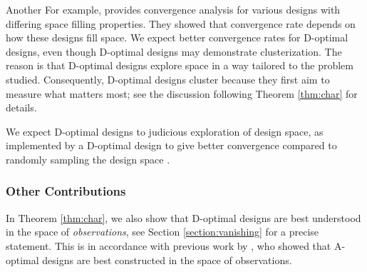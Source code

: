 Another For example, \cite{tekentrup2020} provides convergence analysis for
various designs with differing space filling properties. They showed
that convergence rate depends on how these designs fill space. We
expect better convergence rates for D-optimal designs, even though
D-optimal designs may demonstrate clusterization. The reason is that
D-optimal designs explore space in a way tailored to the problem
studied. Consequently, D-optimal designs cluster because they first
aim to measure what matters most; see the discussion following
Theorem \ref{thm:char} for details.









We expect D-optimal designs to judicious exploration of
design space, as implemented by a D-optimal design to give better
convergence compared to randomly sampling the design
space \cite{knapik2011}.












\subsubsection{Other Contributions}
In Theorem \ref{thm:char}, we also show that D-optimal designs are
best understood in the space of \emph{observations}, see Section
\ref{section:vanishing} for a precise statement. This is in accordance
with previous work by \cite{koval2020}, who showed that A-optimal
designs are best constructed in the space of observations.

